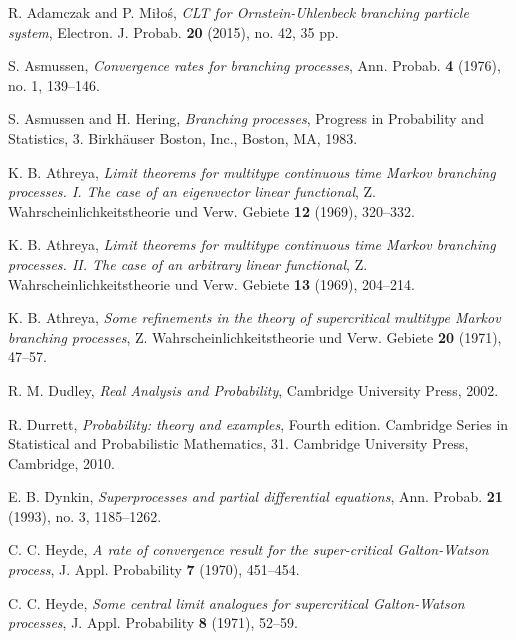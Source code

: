 \documentclass[12pt,a4paper]{amsart}
\theoremstyle{plain}
\theoremstyle{definition}
\numberwithin{equation}{section}
\begin{document}
\begin{thebibliography}{10}

  R. Adamczak and P. Mi{\l}o\'{s}, \emph{C{LT} for {O}rnstein-{U}hlenbeck branching particle system},
  Electron. J. Probab. \textbf{20} (2015), no. 42, 35 pp.

  S. Asmussen, \emph{Convergence rates for branching processes},
  Ann. Probab.  \textbf{4} (1976), no. 1, 139--146.

  S. Asmussen and H. Hering, \emph{Branching processes},
  Progress in Probability and Statistics, 3. Birkh\"{a}user Boston, Inc., Boston, MA, 1983.

  K. B. Athreya,
  \emph{Limit theorems for multitype continuous time {M}arkov branching processes. {I}. {T}he case of an eigenvector linear functional},
  Z. Wahrscheinlichkeitstheorie und Verw. Gebiete \textbf{12} (1969), 320--332.

  K. B. Athreya,
  \emph{Limit theorems for multitype continuous time {M}arkov branching processes. {II}. {T}he case of an arbitrary linear functional},
  Z. Wahrscheinlichkeitstheorie und Verw. Gebiete \textbf{13} (1969), 204--214.

  K. B. Athreya,
  \emph{Some refinements in the theory of supercritical multitype {M}arkov branching processes},
  Z. Wahrscheinlichkeitstheorie und Verw. Gebiete \textbf{20} (1971), 47--57.

  R. M. Dudley,
\emph{Real Analysis and Probability},
  Cambridge University Press, 2002.
  
 R. Durrett,
 \emph{Probability: theory and examples},
 Fourth edition. Cambridge Series in Statistical and Probabilistic Mathematics, 31. Cambridge University Press, Cambridge, 2010.

  E. B. Dynkin,
  \emph{Superprocesses and partial differential equations},
  Ann. Probab. \textbf{21} (1993), no. 3, 1185--1262.

C. C. Heyde,
 \emph{A rate of convergence result for the super-critical {G}alton-{W}atson process},
  J. Appl. Probability \textbf{7} (1970), 451--454.

  C. C. Heyde,
   \emph{Some central limit analogues for supercritical {G}alton-{W}atson processes},
  J. Appl. Probability \textbf{8} (1971), 52--59.


\end{thebibliography}
\end{document}
